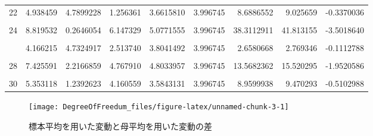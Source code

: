 \documentclass[]{tufte-handout}
\begin{document}
\begin{table}
{\begin{tabular}[t]{rrrrrrrrr}
22 & 4.938459 & 4.7899228 & 1.256361 & 3.6615810 & 3.996745 & 8.6886552 & 9.025659 & -0.3370036\\
\cellcolor{gray!6}{23} & \cellcolor{gray!6}{1.475681} & \cellcolor{gray!6}{1.8195438} & \cellcolor{gray!6}{2.536436} & \cellcolor{gray!6}{1.9438869} & \cellcolor{gray!6}{3.996745} & \cellcolor{gray!6}{0.5857917} & \cellcolor{gray!6}{13.228464} & \cellcolor{gray!6}{-12.6426723}\\
24 & 8.819532 & 0.2646054 & 6.147329 & 5.0771555 & 3.996745 & 38.3112911 & 41.813155 & -3.5018640\\
\cellcolor{gray!6}{25} & \cellcolor{gray!6}{4.115611} & \cellcolor{gray!6}{5.3069370} & \cellcolor{gray!6}{4.355087} & \cellcolor{gray!6}{4.5925452} & \cellcolor{gray!6}{3.996745} & \cellcolor{gray!6}{0.7942081} & \cellcolor{gray!6}{1.859144} & \cellcolor{gray!6}{-1.0649354}\\
\addlinespace
26 & 4.166215 & 4.7324917 & 2.513740 & 3.8041492 & 3.996745 & 2.6580668 & 2.769346 & -0.1112788\\
\cellcolor{gray!6}{27} & \cellcolor{gray!6}{2.464780} & \cellcolor{gray!6}{6.2689757} & \cellcolor{gray!6}{1.749776} & \cellcolor{gray!6}{3.4945107} & \cellcolor{gray!6}{3.996745} & \cellcolor{gray!6}{11.8020997} & \cellcolor{gray!6}{12.558816} & \cellcolor{gray!6}{-0.7567164}\\
28 & 7.425591 & 2.2166859 & 4.767910 & 4.8033957 & 3.996745 & 13.5682362 & 15.520295 & -1.9520586\\
\cellcolor{gray!6}{29} & \cellcolor{gray!6}{3.258395} & \cellcolor{gray!6}{6.3141248} & \cellcolor{gray!6}{4.093102} & \cellcolor{gray!6}{4.5552074} & \cellcolor{gray!6}{3.996745} & \cellcolor{gray!6}{4.9890542} & \cellcolor{gray!6}{5.924697} & \cellcolor{gray!6}{-0.9356424}\\
30 & 5.353118 & 1.2392623 & 4.160559 & 3.5843131 & 3.996745 & 8.9599938 & 9.470293 & -0.5102988\\
\bottomrule
\end{tabular}}
\end{table}

\begin{figure}

{\centering \texttt{[image: DegreeOfFreedum\_files/figure-latex/unnamed-chunk-3-1]} 

}

\caption[標本平均を用いた変動と母平均を用いた変動の差]{標本平均を用いた変動と母平均を用いた変動の差}\label{fig:unnamed-chunk-3}
\end{figure}
\end{document}
